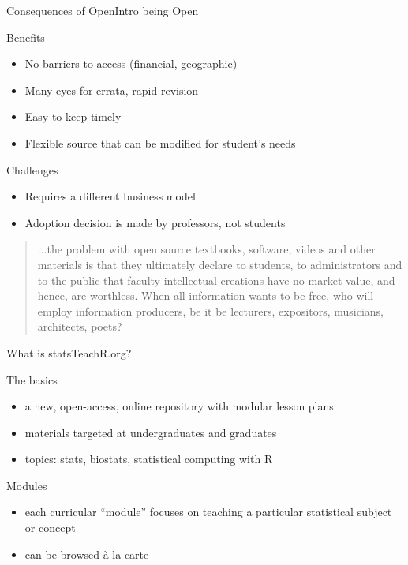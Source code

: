 \begin{frame}{Consequences of OpenIntro being Open}
\begin{block}{Benefits}
\begin{itemize}
\item No barriers to access (financial, geographic)
\item Many eyes for errata, rapid revision
\item Easy to keep timely
\item Flexible source that can be modified for student's needs
\end{itemize}
\end{block}

\begin{block}{Challenges}
\begin{itemize}
\item Requires a different business model
\item Adoption decision is made by professors, not students
\end{itemize}
\end{block}

\begin{quote}
\footnotesize
...the problem with open source textbooks, software, videos and other materials is that they ultimately declare to students, to administrators and to the public that faculty intellectual creations have no market value, and hence, are worthless.  When all information wants to be free, who will employ information producers, be it be lecturers, expositors, musicians, architects, poets?
\end{quote}
\end{frame}



\begin{frame}{What is statsTeachR.org?}

\begin{block}{The basics}
\begin{itemize}
        \item a new, open-access, online repository with modular lesson plans
        \item materials targeted at undergraduates and graduates 
        \item topics: stats, biostats, statistical computing with R
\end{itemize}
\end{block}

\begin{block}{Modules}
\begin{itemize}
        \item each curricular ``module'' focuses on teaching a particular statistical subject or concept
        \item can be browsed \`a la carte
\end{itemize}
\end{block}

\end{frame}

